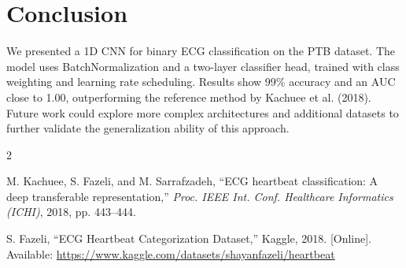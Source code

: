 \documentclass[conference]{IEEEtran}
\begin{document}
\section{Conclusion}

We presented a 1D CNN for binary ECG classification on the PTB dataset. The model uses BatchNormalization and a two-layer classifier head, trained with class weighting and learning rate scheduling. Results show 99\% accuracy and an AUC close to 1.00, outperforming the reference method by Kachuee et al. (2018). Future work could explore more complex architectures and additional datasets to further validate the generalization ability of this approach.


\begin{thebibliography}{2}

M. Kachuee, S. Fazeli, and M. Sarrafzadeh,
``ECG heartbeat classification: A deep transferable representation,''
\textit{Proc. IEEE Int. Conf. Healthcare Informatics (ICHI)},
2018, pp. 443--444.

S. Fazeli,
``ECG Heartbeat Categorization Dataset,''
Kaggle, 2018. [Online]. Available: \url{https://www.kaggle.com/datasets/shayanfazeli/heartbeat}

\end{thebibliography}
\end{document}
